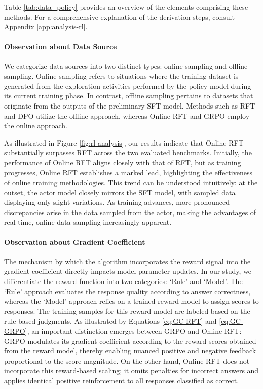 \begin{itemize}[topsep=0pt]
\begin{itemize}[topsep=0pt]
Table \ref{tab:data_policy} provides an overview of the elements comprising these methods. For a comprehensive explanation of the derivation steps, consult Appendix \ref{app:analysis-rl}.

\paragraph{Observation about Data Source} We categorize data sources into two distinct types: online sampling and offline sampling. Online sampling refers to situations where the training dataset is generated from the exploration activities performed by the policy model during its current training phase. In contrast, offline sampling pertains to datasets that originate from the outputs of the preliminary SFT model. Methods such as RFT and DPO utilize the offline approach, whereas Online RFT and GRPO employ the online approach.

As illustrated in Figure \ref{fig:rl-analysis}, our results indicate that Online RFT substantially surpasses RFT across the two evaluated benchmarks. Initially, the performance of Online RFT aligns closely with that of RFT, but as training progresses, Online RFT establishes a marked lead, highlighting the effectiveness of online training methodologies. This trend can be understood intuitively: at the outset, the actor model closely mirrors the SFT model, with sampled data displaying only slight variations. As training advances, more pronounced discrepancies arise in the data sampled from the actor, making the advantages of real-time, online data sampling increasingly apparent.

\paragraph{Observation about Gradient Coefficient} The mechanism by which the algorithm incorporates the reward signal into the gradient coefficient directly impacts model parameter updates. In our study, we differentiate the reward function into two categories: `Rule' and `Model'. The `Rule' approach evaluates the response quality according to answer correctness, whereas the `Model' approach relies on a trained reward model to assign scores to responses. The training samples for this reward model are labeled based on the rule-based judgments. As illustrated by Equations \ref{eq:GC-RFT} and \ref{eq:GC-GRPO}, an important distinction emerges between GRPO and Online RFT: GRPO modulates its gradient coefficient according to the reward scores obtained from the reward model, thereby enabling nuanced positive and negative feedback proportional to the score magnitude. On the other hand, Online RFT does not incorporate this reward-based scaling; it omits penalties for incorrect answers and applies identical positive reinforcement to all responses classified as correct.


\end{itemize}
\end{itemize}
